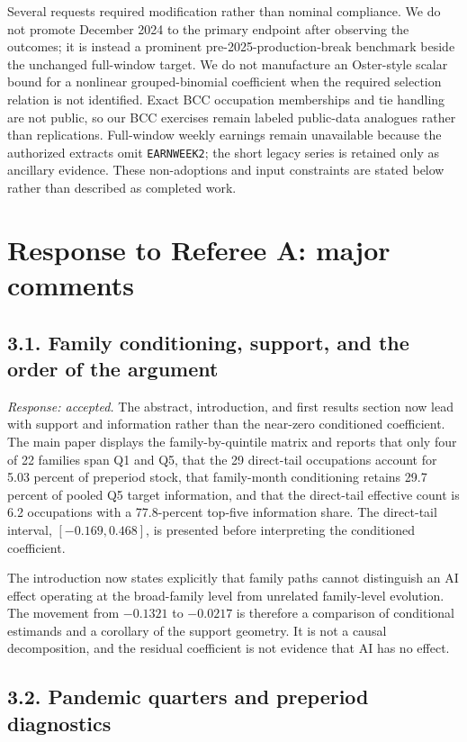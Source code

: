 \documentclass[11pt,letterpaper]{article}
\begin{document}
Several requests required modification rather than nominal compliance.  We do not promote December 2024 to the primary endpoint after observing the outcomes; it is instead a prominent pre-2025-production-break benchmark beside the unchanged full-window target.  We do not manufacture an Oster-style scalar bound for a nonlinear grouped-binomial coefficient when the required selection relation is not identified.  Exact BCC occupation memberships and tie handling are not public, so our BCC exercises remain labeled public-data analogues rather than replications.  Full-window weekly earnings remain unavailable because the authorized extracts omit \texttt{EARNWEEK2}; the short legacy series is retained only as ancillary evidence.  These non-adoptions and input constraints are stated below rather than described as completed work.

\section*{Response to Referee A: major comments}

\subsection*{3.1. Family conditioning, support, and the order of the argument}

\emph{Response: accepted.}  The abstract, introduction, and first results section now lead with support and information rather than the near-zero conditioned coefficient.  The main paper displays the family-by-quintile matrix and reports that only four of 22 families span Q1 and Q5, that the 29 direct-tail occupations account for 5.03 percent of preperiod stock, that family-month conditioning retains 29.7 percent of pooled Q5 target information, and that the direct-tail effective count is 6.2 occupations with a 77.8-percent top-five information share.  The direct-tail interval, $[-0.169,0.468]$, is presented before interpreting the conditioned coefficient.

The introduction now states explicitly that family paths cannot distinguish an AI effect operating at the broad-family level from unrelated family-level evolution.  The movement from $-0.1321$ to $-0.0217$ is therefore a comparison of conditional estimands and a corollary of the support geometry.  It is not a causal decomposition, and the residual coefficient is not evidence that AI has no effect.

\subsection*{3.2. Pandemic quarters and preperiod diagnostics}
\end{document}

